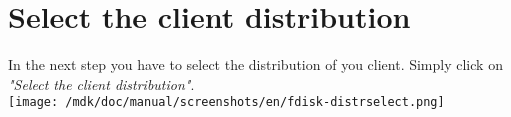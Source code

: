 \section{Select the client distribution}In the next step you have to select the distribution of you client. Simply click on \textit{"Select the client distribution"}.\\
\texttt{[image: /mdk/doc/manual/screenshots/en/fdisk-distrselect.png]} \\
